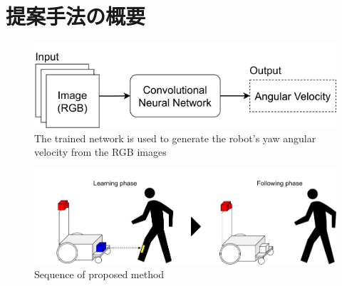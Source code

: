 
\section{提案手法の概要}

\begin{figure}[h]
  \centering
  \includegraphics[keepaspectratio, scale=0.60] {images/RobotGuidance_simple_system.png}
  \captionsetup{justification=raggedright} %
  \caption{The trained network is used to generate the robot's yaw angular velocity from the RGB images}
  \label{Fig:RobotGuidance_simple_system}
\end{figure}

\begin{figure}[h]
  \centering
  \includegraphics[keepaspectratio, scale=0.35] {images/RobotGuidance_all_system.png}
  \captionsetup{justification=raggedright} %
  \caption{Sequence of proposed method}
  \label{Fig:RobotGuidance_all_system}
\end{figure}

